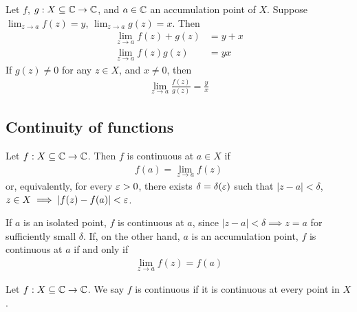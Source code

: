 \documentclass{../../template/note}
\begin{document}
    \begin{lemma}
        Let \(f\), \(g: X \subseteq \mathbb C \to \mathbb C\), and \(a \in \mathbb C\) an accumulation point of \(X\). Suppose \(\lim_{z \to a}f(z) = y\), \(\lim_{z \to a}g(z) = x\). Then
        \begin{align*}
            \lim_{z \to a} f(z) + g(z) &= y + x \\
            \lim_{z \to a} f(z)g(z) &= yx
        \end{align*}
        If \(g(z) \neq 0\) for any \(z \in X\), and \(x \neq 0\), then
        \begin{align*}
            \lim_{z \to a} \frac{f(z)}{g(z)} = \frac{y}{x}
        \end{align*}
    \end{lemma}
    
    \subsection{Continuity of functions}

    \begin{definition}
        Let \(f: X \subseteq \mathbb C \to \mathbb C\). Then \(f\) is continuous at \(a \in X\) if
        \begin{align*}
            f(a) = \lim_{z \to a}f(z)
        \end{align*}
        or, equivalently, for every \(\varepsilon > 0\), there exists \(\delta = \delta(\varepsilon)\) such that \(|z-a| < \delta\), \(z \in X \implies |f(z)-f(a)| < \varepsilon\).        
    \end{definition}

    If \(a\) is an isolated point, \(f\) is continuous at \(a\), since \(|z-a| < \delta \implies z = a\) for sufficiently small \(\delta\). If, on the other hand, \(a\) is an accumulation point, \(f\) is continuous at \(a\) if and only if
    \begin{align*}
        \lim_{z \to a} f(z) = f(a)
    \end{align*}
    

    \begin{definition}
        Let \(f: X \subseteq \mathbb C \to \mathbb C\). We say \(f\) is continuous if it is continuous at every point in \(X\).
    \end{definition}
\end{document}
